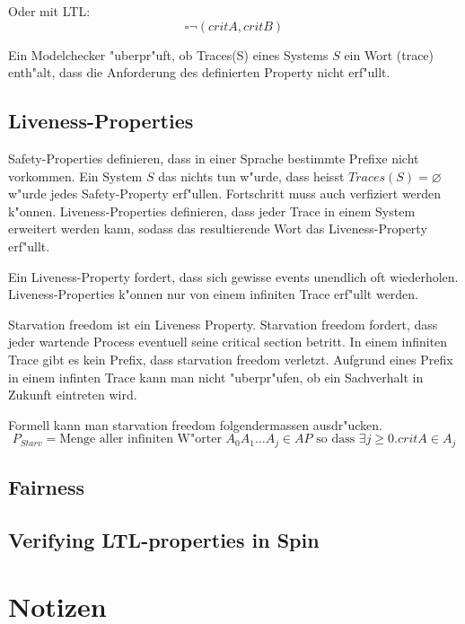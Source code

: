 \documentclass[11pt,twoside,a4paper]{article}
\begin{document}
Oder mit LTL:
\[
\square \neg (critA,critB)
\]

Ein Modelchecker "uberpr"uft, ob Traces(S) eines Systems $S$ ein Wort (trace) enth"alt, dass die Anforderung des definierten Property nicht erf"ullt.

\subsection{Liveness-Properties}
\label{sec:liveness}

Safety-Properties definieren, dass in einer Sprache bestimmte Prefixe nicht vorkommen. Ein System $S$ das nichts tun w"urde, dass heisst $Traces(S)=\varnothing$ w"urde jedes Safety-Property erf"ullen. Fortschritt muss auch verfiziert werden k"onnen. Liveness-Properties definieren, dass jeder Trace in einem System erweitert werden kann, sodass das resultierende Wort das Liveness-Property erf"ullt.

Ein Liveness-Property fordert, dass sich gewisse events unendlich oft wiederholen. Liveness-Properties k"onnen nur von einem infiniten Trace erf"ullt werden. 

Starvation freedom ist ein Liveness Property. Starvation freedom fordert, dass jeder wartende Process eventuell seine critical section betritt. In einem infiniten Trace gibt es kein Prefix, dass starvation freedom verletzt. Aufgrund eines Prefix in einem infinten Trace kann man nicht "uberpr"ufen, ob ein Sachverhalt in Zukunft eintreten wird.

Formell kann man starvation freedom folgendermassen ausdr"ucken.
\[
P_{Starv} = \text{Menge aller infiniten W"orter } A_0 A_1 \dots A_j \in AP \text{ so dass }\exists j \geq 0. critA \in A_j
\]

\subsection{Fairness}
\label{sec:fairness}


\subsection{Verifying LTL-properties in Spin}
\label{sec:verifying_ltl-properties}


\appendix

\section{Notizen}
\end{document}
